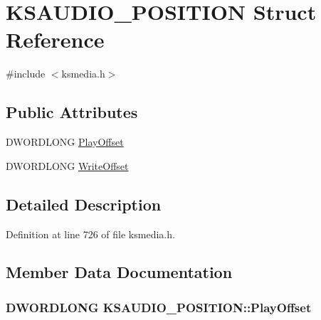 \hypertarget{struct_k_s_a_u_d_i_o___p_o_s_i_t_i_o_n}{}\section{K\+S\+A\+U\+D\+I\+O\+\_\+\+P\+O\+S\+I\+T\+I\+ON Struct Reference}
\label{struct_k_s_a_u_d_i_o___p_o_s_i_t_i_o_n}


{\ttfamily \#include $<$ksmedia.\+h$>$}

\subsection*{Public Attributes}
\begin{DoxyCompactItemize}
\item 
D\+W\+O\+R\+D\+L\+O\+NG \hyperlink{struct_k_s_a_u_d_i_o___p_o_s_i_t_i_o_n_ab8d1aec9b5d92cadb62351c578cfb391}{Play\+Offset}
\item 
D\+W\+O\+R\+D\+L\+O\+NG \hyperlink{struct_k_s_a_u_d_i_o___p_o_s_i_t_i_o_n_a47768664ecfd962c7e926e5fdee573c1}{Write\+Offset}
\end{DoxyCompactItemize}


\subsection{Detailed Description}


Definition at line 726 of file ksmedia.\+h.



\subsection{Member Data Documentation}
\subsubsection[{\texorpdfstring{Play\+Offset}{PlayOffset}}]{\setlength{\rightskip}{0pt plus 5cm}D\+W\+O\+R\+D\+L\+O\+NG K\+S\+A\+U\+D\+I\+O\+\_\+\+P\+O\+S\+I\+T\+I\+O\+N\+::\+Play\+Offset}\hypertarget{struct_k_s_a_u_d_i_o___p_o_s_i_t_i_o_n_ab8d1aec9b5d92cadb62351c578cfb391}{}\label{struct_k_s_a_u_d_i_o___p_o_s_i_t_i_o_n_ab8d1aec9b5d92cadb62351c578cfb391}


